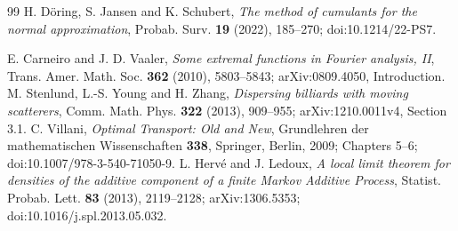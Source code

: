 \begin{thebibliography}{99}
 H. D\"oring, S. Jansen and K. Schubert,
\emph{The method of cumulants for the normal approximation},
Probab. Surv. \textbf{19} (2022), 185--270; doi:10.1214/22-PS7.

 E. Carneiro and J. D. Vaaler,
\emph{Some extremal functions in Fourier analysis, II},
Trans. Amer. Math. Soc. \textbf{362} (2010), 5803--5843;
arXiv:0809.4050, Introduction.
 M. Stenlund, L.-S. Young and H. Zhang,
\emph{Dispersing billiards with moving scatterers},
Comm. Math. Phys. \textbf{322} (2013), 909--955;
arXiv:1210.0011v4, Section 3.1.
 C. Villani, \emph{Optimal Transport: Old and New},
Grundlehren der mathematischen Wissenschaften \textbf{338}, Springer,
Berlin, 2009; Chapters 5--6; doi:10.1007/978-3-540-71050-9.
 L. Herv\'e and J. Ledoux,
\emph{A local limit theorem for densities of the additive component of a
finite Markov Additive Process}, Statist. Probab. Lett. \textbf{83}
(2013), 2119--2128; arXiv:1306.5353; doi:10.1016/j.spl.2013.05.032.
\end{thebibliography}
